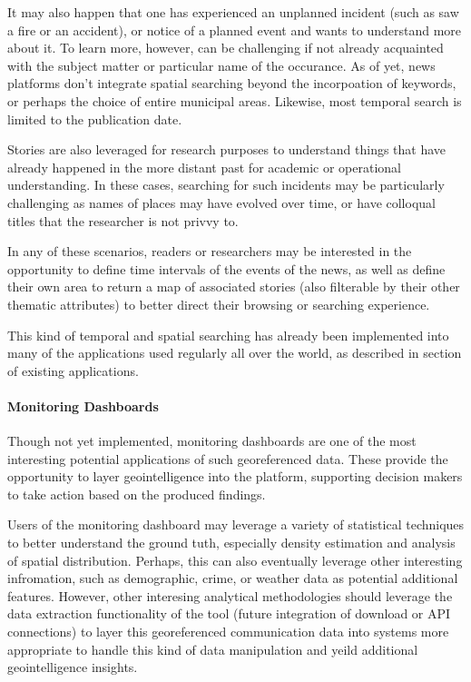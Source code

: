 It may also happen that one has experienced an unplanned incident (such as saw a fire or an accident), or notice of a planned event and wants to understand more about it. To learn more, however, can be challenging if not already acquainted with the subject matter or particular name of the occurance. As of yet, news platforms don't integrate spatial searching beyond the incorpoation of keywords, or perhaps the choice of entire municipal areas.  Likewise, most temporal search is limited to the publication date.

Stories are also leveraged for research purposes to understand things that have already happened in the more distant past for academic or operational understanding. In these cases, searching for such incidents may be particularly challenging as names of places may have evolved over time, or have colloqual titles that the researcher is not privvy to.

In any of these scenarios, readers or researchers may be interested in the opportunity to define time intervals of the events of the news, as well as define their own area to return a map of associated stories (also filterable by their other thematic attributes) to better direct their browsing or searching experience.

This kind of temporal and spatial searching has already been implemented into many of the applications used regularly all over the world, as described in {\color{red}section of existing applications}. 

\paragraph{Monitoring Dashboards}
Though not yet implemented, monitoring dashboards are one of the most interesting potential applications of such georeferenced data. These provide the opportunity to layer geointelligence into the platform, supporting decision makers to take action based on the produced findings.

Users of the monitoring dashboard may leverage a variety of statistical techniques to better understand the ground tuth, especially density estimation and analysis of spatial distribution. Perhaps, this can also eventually leverage other interesting infromation, such as demographic, crime, or weather data as potential additional features. However, other interesing analytical methodologies should leverage the data extraction functionality of the tool (future integration of download or API connections) to layer this georeferenced communication data into systems more appropriate to handle this kind of data manipulation and yeild additional geointelligence insights.

